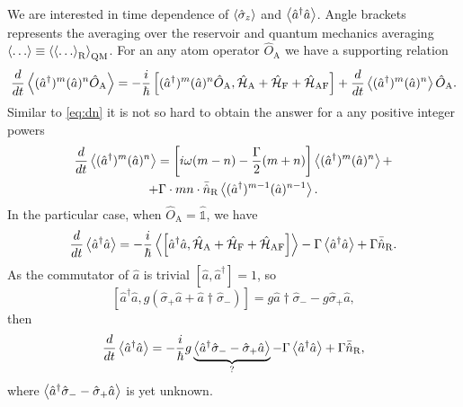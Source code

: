 We are interested in time dependence of $\left\langle {\hat{\sigma}_z} \right\rangle$ and $\left\langle {\hat{a}^{\dagger} \hat{a}} \right\rangle$. Angle brackets represents the averaging over the reservoir and quantum mechanics averaging $\left\langle {\dots} \right\rangle \equiv \left\langle {\left\langle {\dots} \right\rangle_{\text{R}}} \right\rangle_{\text{QM}}$. For an any atom operator $\hat{O}_{\text{A}}$ we have a supporting relation
\begin{equation}
	\frac{d}{dt} \left\langle {(\hat{a}^{\dagger})^m (\hat{a})^n \hat{O}_{\text{A}} } \right\rangle= - \frac{i}{\hbar} \left[ (\hat{a}^{\dagger})^m (\hat{a})^n \hat{O}_{\text{A}}, \hat{\mathcal{H}}_{\text{A}} + \hat{\mathcal{H}}_{\text{F}} + \hat{\mathcal{H}}_{\text{AF}} \right] + \frac{d}{dt} \left\langle { (\hat{a}^{\dagger})^m (\hat{a})^n } \right\rangle \hat{O}_{\text{A}}.
\end{equation} 
Similar to \eqref{eq:dn} it is not so hard to obtain the answer for a any positive integer powers 
\begin{multline}
	\frac{d}{dt} \left\langle {(\hat{a}^{\dagger})^m (\hat{a})^n} \right\rangle = \left[ i \omega (m-n) - \frac{\Gamma}{2}(m+n) \right] \left\langle {(\hat{a}^{\dagger})^m (\hat{a})^n} \right\rangle + \\ + \Gamma\cdot  mn \cdot \bar{\hat{n}}_{\text{R}} \left\langle {(\hat{a}^{\dagger})^{m-1} (\hat{a})^{n-1}} \right\rangle.
\end{multline}
In the particular case, when $\hat{O}_{\text{A}} = \hat{\mathbb{1}}$, we have
\begin{equation}
	\frac{d}{dt} \left\langle {\hat{a}^{\dagger} \hat{a}} \right\rangle = - \frac{i}{\hbar} \left\langle {\left[ \hat{a}^{\dagger} \hat{a}, \hat{\mathcal{H}}_{\text{A}} + \hat{\mathcal{H}}_{\text{F}} + \hat{\mathcal{H}}_{\text{AF}} \right]} \right\rangle - \Gamma \left\langle {\hat{a}^{\dagger} \hat{a}} \right\rangle + \Gamma \bar{\hat{n}}_{\text{R}}.
\end{equation}
As the commutator of $\hat{a}$ is trivial $\left[\hat{a}, \hat{a}^{\dagger}\right]=1$, so
\begin{equation}
	\left[ \hat{a}^{\dagger} \hat{a}, g \left( \hat{\sigma}_+ \hat{a} + \hat{a}\dag \hat{\sigma}_-\right) \right] =  g \hat{a}\dag \hat{\sigma}_- - g \hat{\sigma}_+ \hat{a},
\end{equation}
then
\begin{equation}
	\frac{d}{dt} \left\langle {\hat{a}^{\dagger} \hat{a}} \right\rangle = - \frac{i}{\hbar} g\underbrace{\left\langle {\hat{a}^{\dagger}\hat{\sigma}_- - \hat{\sigma}_+ \hat{a}} \right\rangle}_{?} - \Gamma \left\langle {\hat{a}^{\dagger} \hat{a}} \right\rangle + \Gamma \bar{\hat{n}}_{\text{R}},
	\label{eq:aa}
\end{equation}
where $\left\langle {\hat{a}^{\dagger}\hat{\sigma}_- - \hat{\sigma}_+ \hat{a}} \right\rangle$ is yet unknown.


